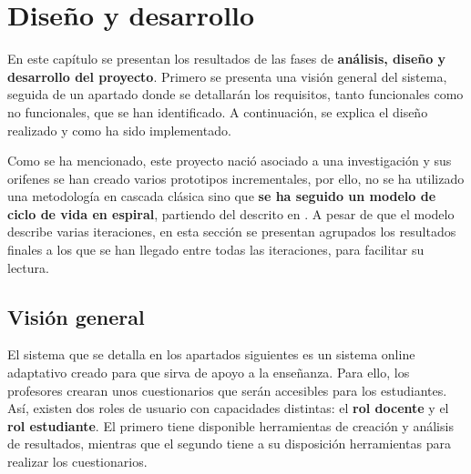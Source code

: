 \chapter{Diseño y desarrollo\label{sec:disenhoYDesarrollo}}


%

En este capítulo se presentan los resultados de las fases de \textbf{análisis, diseño y desarrollo del proyecto}. Primero se presenta una visión general del sistema, seguida de un apartado donde se detallarán los requisitos, tanto funcionales como no funcionales, que se han identificado. A continuación, se explica el diseño realizado y como ha sido implementado.

Como se ha mencionado, este proyecto nació asociado a una investigación y sus orifenes se han creado varios prototipos incrementales, por ello, no se ha utilizado una metodología en cascada clásica sino que \textbf{se ha seguido un modelo de ciclo de vida en espiral}, partiendo del descrito en \cite{Boehm86}. A pesar de que el modelo describe varias iteraciones, en esta sección se presentan agrupados los resultados finales a los que se han llegado entre todas las iteraciones, para facilitar su lectura.


\section{Visión general}

El sistema que se detalla en los apartados siguientes es un sistema online adaptativo creado para que sirva de apoyo a la enseñanza. Para ello, los profesores crearan unos cuestionarios que serán accesibles para los estudiantes. Así, existen dos roles de usuario con capacidades distintas: el \textbf{rol docente} y el \textbf{rol estudiante}. El primero tiene disponible herramientas de creación y análisis de resultados, mientras que el segundo tiene a su disposición herramientas para realizar los cuestionarios.

